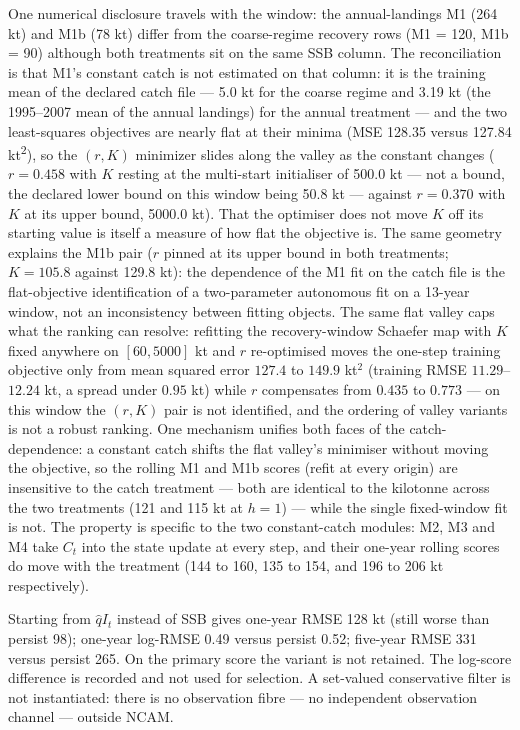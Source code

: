 \documentclass[11pt]{article}
\begin{document}
One numerical disclosure travels with the window: the annual-landings M1
(264 kt) and M1b (78 kt) differ from the coarse-regime recovery rows (M1
= 120, M1b = 90) although both treatments sit on the same SSB column.
The reconciliation is that M1's constant catch is not estimated on that
column: it is the training mean of the declared catch file --- 5.0 kt
for the coarse regime and 3.19 kt (the 1995--2007 mean of the annual
landings) for the annual treatment --- and the two least-squares
objectives are nearly flat at their minima (MSE 128.35 versus 127.84
kt\textsuperscript{2}), so the \((r, K)\) minimizer slides along the valley as the
constant changes (\(r = 0.458\) with \(K\) resting at the multi-start
initialiser of 500.0 kt --- not a bound, the declared lower bound on
this window being 50.8 kt --- against \(r = 0.370\) with \(K\) at its
upper bound, 5000.0 kt). That the optimiser does not move \(K\) off its
starting value is itself a measure of how flat the objective is. The
same geometry explains the M1b pair (\(r\) pinned at its
upper bound in both treatments; \(K = 105.8\) against 129.8 kt): the
dependence of the M1 fit on the catch file is the flat-objective
identification of a two-parameter autonomous fit on a 13-year window,
not an inconsistency between fitting objects. The same flat valley caps
what the ranking can resolve: refitting the recovery-window Schaefer map
with \(K\) fixed anywhere on \([60, 5000]\) kt and \(r\) re-optimised
moves the one-step training objective only from mean squared error
\(127.4\) to \(149.9\) kt\(^2\) (training RMSE \(11.29\)--\(12.24\) kt,
a spread under \(0.95\) kt) while \(r\) compensates from \(0.435\) to
\(0.773\) --- on this window the \((r, K)\) pair is not identified, and
the ordering of valley variants is not a robust ranking. One mechanism
unifies both faces of the catch-dependence: a constant catch shifts the
flat valley's minimiser without moving the objective, so the rolling
M1 and M1b scores (refit at every origin) are insensitive to the catch
treatment --- both are identical to the kilotonne across the two
treatments (121 and 115 kt at \(h=1\)) --- while the single
fixed-window fit is not. The property is specific to the two
constant-catch modules: M2, M3 and M4 take \(C_t\) into the state
update at every step, and their one-year rolling scores do move with the
treatment (144 to 160, 135 to 154, and 196 to 206 kt respectively).

Starting from \(\hat q I_t\) instead of SSB gives one-year RMSE 128 kt
(still worse than persist 98); one-year log-RMSE 0.49 versus persist
0.52; five-year RMSE 331 versus persist 265. On the primary score the
variant is not retained. The log-score difference is recorded and not
used for selection. A set-valued conservative filter is not
instantiated: there is no observation fibre --- no independent
observation channel --- outside NCAM.
\end{document}

